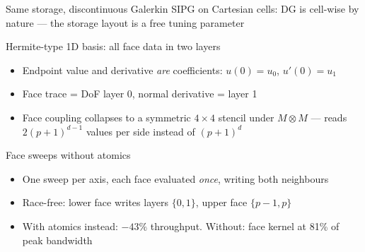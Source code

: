 \documentclass{beamer}
\begin{document}

\begin{frame}{Same storage, discontinuous Galerkin}
    SIPG on Cartesian cells: DG is cell-wise by nature --- the storage layout is a free tuning parameter
    \vfill
    \begin{block}{Hermite-type 1D basis: all face data in two layers}
        \begin{itemize}
            \small
            \item Endpoint value and derivative \emph{are} coefficients: $u(0)=u_0$, $u'(0)=u_1$
            \item Face trace = DoF layer 0, normal derivative = layer 1
            \item Face coupling collapses to a symmetric $4\times 4$ stencil under $M\otimes M$ --- reads $2(p{+}1)^{d-1}$ values per
                  side instead of $(p{+}1)^d$
        \end{itemize}
    \end{block}
    \vfill
    \begin{block}{Face sweeps without atomics}
        \begin{itemize}
            \small
            \item One sweep per axis, each face evaluated \emph{once}, writing both neighbours
            \item Race-free: lower face writes layers $\{0,1\}$, upper face $\{p{-}1,p\}$
            \item With atomics instead: \alert{$-43\%$} throughput. Without: face kernel at \alert{81\% of peak bandwidth}
        \end{itemize}
    \end{block}
\end{frame}
\end{document}
